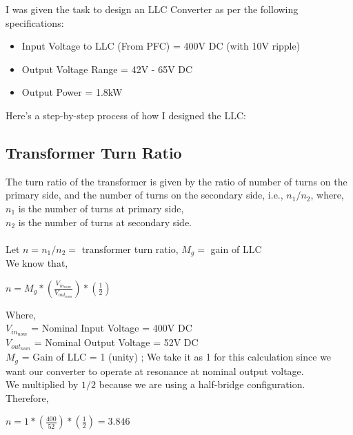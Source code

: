 I was given the task to design an LLC Converter as per the following specifications:

\begin{itemize}
    \item Input Voltage to LLC (From PFC) = 400V DC (with 10V ripple)
    \item Output Voltage Range = 42V - 65V DC
    \item Output Power = 1.8kW
\end{itemize}
\noindent
Here's a step-by-step process of how I designed the LLC:

\subsection{Transformer Turn Ratio}
The turn ratio of the transformer is given by the ratio of number of turns on the primary side, and the number of turns on the secondary side, i.e., $n_1 / n_2$, where,\\
$n_1$ is the number of turns at primary side,\\
$n_2$ is the number of turns at secondary side.\\
\\
Let $n = n_1 / n_2 =$ transformer turn ratio, $M_g =$ gain of LLC\\
We know that,
\begin{center}
    $n = M_g * (\frac{V_{in_{nom}}}{V_{out_{nom}}}) * (\frac{1}{2})$
\end{center}
Where,\\
$V_{in_{nom}}$ = Nominal Input Voltage = 400V DC\\
$V_{out_{nom}}$ = Nominal Output Voltage = 52V DC\\
$M_g$ = Gain of LLC = 1 (unity) ; We take it as 1 for this calculation since we want our converter to operate at resonance at nominal output voltage.\\
We multiplied by $1/2$ because we are using a half-bridge configuration.
\\
Therefore,
\begin{center}
    $n = 1 * (\frac{400}{52}) * (\frac{1}{2}) = 3.846$\\
\end{center}

